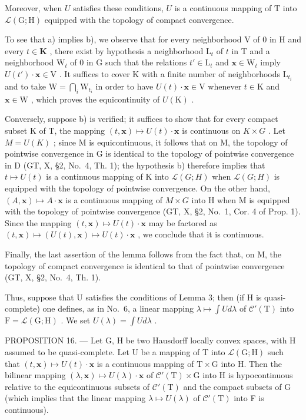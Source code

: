 Moreover, when \(U\) satisfies these conditions, \(U\) is a continuous mapping of \(\mathrm{T}\) into \(\mathcal{L}(\mathrm{G};\mathrm{H})\) equipped with the topology of compact convergence.

To see that a) implies b), we observe that for every neighborhood V of 0 in H and every \(t \in \mathbf{K}\) , there exist by hypothesis a neighborhood \(\mathrm{L}_t\) of \(t\) in T and a neighborhood \(\mathrm{W}_t\) of 0 in G such that the relations \(t' \in \mathrm{L}_t\) and \(\mathbf{x} \in \mathrm{W}_t\) imply \(U(t') \cdot \mathbf{x} \in \mathrm{V}\) . It suffices to cover K with a finite number of neighborhoods \(\mathrm{L}_{t_i}\) and to take \(\mathrm{W} = \bigcap_{i} \mathrm{W}_{t_i}\) in order to have \(U(t) \cdot \mathbf{x} \in \mathrm{V}\) whenever \(t \in \mathrm{K}\) and \(\mathbf{x} \in \mathrm{W}\) , which proves the equicontinuity of \(U(\mathrm{K})\) .

Conversely, suppose b) is verified; it suffices to show that for every compact subset K of T, the mapping \((t,\mathbf{x})\mapsto U(t)\cdot\mathbf{x}\) is continuous on \(K\times G\) . Let \(M=U(K)\) ; since M is equicontinuous, it follows that on M, the topology of pointwise convergence in G is identical to the topology of pointwise convergence in D (GT, X, §2, No.~4, Th. 1); the hypothesis b) therefore implies that \(t\mapsto U(t)\) is a continuous mapping of K into \(\mathcal{L}(G;H)\) when \(\mathcal{L}(G;H)\) is equipped with the topology of pointwise convergence. On the other hand, \((A,\mathbf{x})\mapsto A\cdot\mathbf{x}\) is a continuous mapping of \(M\times G\) into H when M is equipped with the topology of pointwise convergence (GT, X, §2, No.~1, Cor. 4 of Prop. 1). Since the mapping \((t,\mathbf{x})\mapsto U(t)\cdot\mathbf{x}\) may be factored as \((t,\mathbf{x})\mapsto(U(t),\mathbf{x})\mapsto U(t)\cdot\mathbf{x}\) , we conclude that it is continuous.

Finally, the last assertion of the lemma follows from the fact that, on M, the topology of compact convergence is identical to that of pointwise convergence (GT, X, §2, No.~4, Th. 1).

Thus, suppose that U satisfies the conditions of Lemma 3; then (if H is quasi-complete) one defines, as in No.~6, a linear mapping \(\lambda \mapsto \int U d\lambda\) of \(\mathcal{C}'(\mathrm{T})\) into \(\mathrm{F} = \mathcal{L}(\mathrm{G}; \mathrm{H})\) . We set \(U(\lambda) = \int U d\lambda\) .

PROPOSITION 16. --- Let G, H be two Hausdorff locally convex spaces, with H assumed to be quasi-complete. Let U be a mapping of T into \(\mathcal{L}(\mathrm{G};\mathrm{H})\) such that \((t,\mathbf{x})\mapsto U(t)\cdot \mathbf{x}\) is a continuous mapping of \(\mathrm{T}\times \mathrm{G}\) into H. Then the bilinear mapping \((\lambda ,\mathbf{x})\mapsto U(\lambda)\cdot \mathbf{x}\) of \(\mathcal{C}'(\mathrm{T})\times \mathrm{G}\) into H is hypocontinuous relative to the equicontinuous subsets of \(\mathcal{C}'(\mathrm{T})\) and the compact subsets of G (which implies that the linear mapping \(\lambda \mapsto U(\lambda)\) of \(\mathcal{C}'(\mathrm{T})\) into F is continuous).

